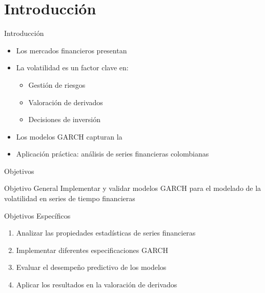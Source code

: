 \section{Introducción}

\begin{frame}{Introducción}
    \begin{itemize}
        \item<1-> Los mercados financieros presentan 
        \item<2-> La volatilidad es un factor clave en:
        \begin{itemize}
            \item Gestión de riesgos
            \item Valoración de derivados
            \item Decisiones de inversión
        \end{itemize}
        \item<3-> Los modelos GARCH capturan la 
        \item<4-> Aplicación práctica: análisis de series financieras colombianas
    \end{itemize}
\end{frame}

\begin{frame}{Objetivos}
    \begin{block}{Objetivo General}
        Implementar y validar modelos GARCH para el modelado de la volatilidad en series de tiempo financieras
    \end{block}
    
    \vspace{0.5em}
    
    \begin{block}{Objetivos Específicos}
        \begin{enumerate}
            \item Analizar las propiedades estadísticas de series financieras
            \item Implementar diferentes especificaciones GARCH
            \item Evaluar el desempeño predictivo de los modelos
            \item Aplicar los resultados en la valoración de derivados
        \end{enumerate}
    \end{block}
\end{frame}